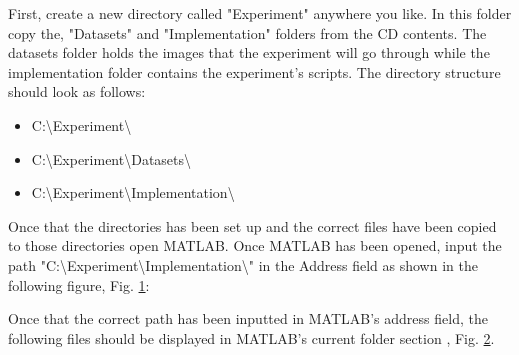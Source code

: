 First, create a new directory called "Experiment" anywhere you like. In this folder copy the, "Datasets" and "Implementation" folders from the CD contents. The datasets folder holds the images that the experiment will go through while the implementation folder contains the experiment's scripts. The directory structure should look as follows:

\begin{itemize}
    \item C:\textbackslash Experiment\textbackslash
    \item C:\textbackslash Experiment\textbackslash Datasets\textbackslash
    \item C:\textbackslash Experiment\textbackslash Implementation\textbackslash
\end{itemize}

Once that the directories has been set up and the correct files have been copied to those directories open MATLAB. Once MATLAB has been opened, input the path "C:\textbackslash Experiment\textbackslash Implementation\textbackslash" in the Address field as shown in the following figure, Fig. \ref{fig:address}:

\begin{figure}[h]
        \centering
        \caption[Inserting correct path in MATLAB address field]{}
        \label{fig:address}
\end{figure}

Once that the correct path has been inputted in MATLAB's address field, the following files should be displayed in MATLAB's current folder section , Fig. \ref{fig:currentfolder}.

\begin{figure}[h]
        \centering
        \caption[Current Folder after inserting the correct path in MATLAB address field]{}
        \label{fig:currentfolder}
\end{figure}

